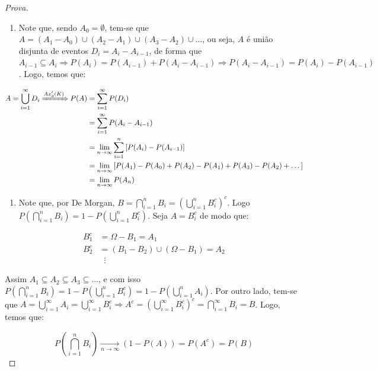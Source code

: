 \documentclass[
]{article}
\providecommand{\tightlist}{%
  \setlength{\itemsep}{0pt}\setlength{\parskip}{0pt}}
\theoremstyle{definition}
\theoremstyle{definition}
\theoremstyle{definition}
\theoremstyle{definition}
\theoremstyle{remark}
\begin{document}
\begin{proof}[Prova]
\leavevmode

\begin{enumerate}
\def\labelenumi{\arabic{enumi}.}
\tightlist
\item
  Note que, sendo \(A_{0} = \emptyset\), tem-se que \(A = (A_{1} - A_{0}) \cup (A_{2} - A_{1}) \cup (A_{3} - A_{2}) \cup \dots\), ou seja, \(A\) é união disjunta de eventos \(D_{i} = A_{i} - A_{i-1}\), de forma que \(A_{i-1} \subseteq A_{i} \Rightarrow P(A_{i}) = P(A_{i-1}) + P(A_{i} - A_{i-1}) \Rightarrow P(A_{i} - A_{i-1}) = P(A_{i}) - P(A_{i-1})\). Logo, temos que:
\end{enumerate}

\begin{align*}
A = \bigcup_{i=1}^{\infty}D_{i} \xRightarrow{Ax'_{3}(K)} P(A) &= \sum_{i=1}^{\infty}P(D_{i})\\
&= \sum_{i=1}^{\infty}P(A_{i} - A_{i-1})\\
&= \lim_{n \to \infty} \sum_{i=1}^{n} \left[P(A_{i}) - P(A_{i-1})\right] \\
&= \lim_{n \to \infty} \left[P(A_{1}) - P(A_{0}) + P(A_{2}) - P(A_{1}) + P(A_{3}) - P(A_{2}) + \dots\right]\\
&= \lim_{n \to \infty} P(A_{n})
\end{align*}

\begin{enumerate}
\def\labelenumi{\arabic{enumi}.}
\setcounter{enumi}{1}
\tightlist
\item
  Note que, por De Morgan, \(B = \bigcap_{i=1}^{n}B_{i} = \left(\bigcup_{i=1}^{n}B_{i}^{c}\right)^{c}\). Logo \(P(\bigcap_{i=1}^{n}B_{i}) = 1 - P(\bigcup_{i = 1}^{n}B_{i}^{c})\). Seja \(A = B_{i}^{c}\) de modo que:
\end{enumerate}

\begin{align*}
B_{1}^{c} &= \Omega - B_{1} = A_1 \\
B_{2}^{c} &= (B_{1} - B_{2}) \cup (\Omega - B_{1}) = A_{2} \\
&\;\;\vdots
\end{align*}

Assim \(A_{1} \subseteq A_{2} \subseteq A_{3} \subseteq \dots\), e com isso \(P(\bigcap_{i=1}^{n}B_{i}) = 1 - P(\bigcup_{i=1}^{n}B_{i}^{c}) = 1 - P(\bigcup_{i = 1}^{n}A_{i})\). Por outro lado, tem-se que \(A = \bigcup_{i = 1}^{\infty}A_{i} = \bigcup_{i=1}^{\infty}B_{i}^{c} \Rightarrow A^{c} = \left(\bigcup_{i=1}^{\infty}B_{i}^{c}\right)^{c} = \bigcap_{i=1}^{\infty} B_{i} = B\). Logo, temos que:

\[
P\left(\bigcap_{i=1}^{n}B_{i}\right) \xrightarrow[n \to \infty]{} (1 - P(A)) = P(A^{c}) = P(B)
\]

\end{proof}
\end{document}

